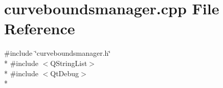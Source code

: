 \section{curveboundsmanager.\+cpp File Reference}
\label{curveboundsmanager_8cpp}
{\ttfamily \#include \char`\"{}curveboundsmanager.\+h\char`\"{}}\\*
{\ttfamily \#include $<$Q\+String\+List$>$}\\*
{\ttfamily \#include $<$Qt\+Debug$>$}\\*
